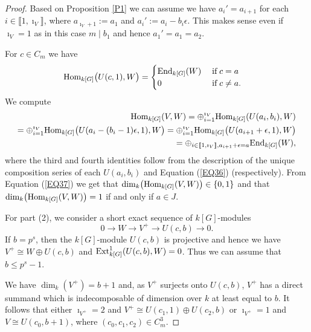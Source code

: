 \documentclass[11pt]{amsart}
\def\End{\textup{End}}
\def\Ext{\textup{Ext}}
\def\Hom{\textup{Hom}}
\begin{document}
\begin{proof}
Based on Proposition \ref{P1} we can assume we have $a_i'=a_{i+1}$ for each $i\in\llbracket1,\imath_V\rrbracket$, where $a_{\imath_V+1}:=a_1$ and $a_i':=a_i-b_i\epsilon$. This makes sense even if $\imath_V=1$ as in this case $m\mid b_1$ and hence $a_1'=a_1=a_2$. 

For $c\in C_m$ we have 
\begin{equation}\label{EQ36}
\Hom_{k[G]}\bigl(U(c,1),W\bigr)=\begin{cases}\End_{k[G]}(W)\quad\;\textup{if}\;c=a\\
0\quad\quad\quad\quad\quad\quad\textup{if}\;c\neq a.\end{cases}
\end{equation} 
We compute
\begin{equation}\label{EQ37}
\begin{split}
\Hom_{k[G]}(V,W)=\oplus_{i=1}^{\imath_V}\Hom_{k[G]}(U(a_i,b_i),W)\\
=\oplus_{i=1}^{\imath_V}\Hom_{k[G]}\bigl(U(a_i-(b_i-1)\epsilon,1),W\bigr)=\oplus_{i=1}^{\imath_V}\Hom_{k[G]}\bigl(U(a_{i+1}+\epsilon,1),W\bigr)\\
=\oplus_{i\in\llbracket1,\imath_V\rrbracket,a_{i+1}+\epsilon=a} \End_{k[G]}(W),\\
\end{split}
\end{equation}
where the third and fourth identities follow from the description of the unique composition series of each $U(a_i,b_i)$ and Equation (\ref{EQ36}) (respectively). 
From Equation (\ref{EQ37}) we get that $\dim_k\bigl(\Hom_{k[G]}(V,W)\bigr)\in\{0,1\}$ and that $\dim_k\bigl(\Hom_{k[G]}(V,W)\bigr)=1$ if and only if $a\in J$.

For part (2), we consider a short exact sequence of $k[G]$-modules 
\begin{equation}\label{EQ38}
0\rightarrow W\rightarrow V^+\rightarrow U(c,b)\rightarrow 0.
\end{equation} 
If $b=p^s$, then the $k[G]$-module $U(c,b)$ is projective and hence we have $V^+\cong W\oplus U(c,b)$ and $\Ext^1_{k[G]}(U(c,b),W)=0$. Thus we can assume that $b\le p^s-1$.

We have $\dim_k(V^+)=b+1$ and, as $V^+$ surjects onto $U(c,b)$, $V^+$ has a direct summand which is indecomposable of dimension over $k$ at least equal to $b$. It follows that either $\imath_{V^+}=2$ and $V^+\cong U(c_1,1)\oplus U(c_2,b)$ or $\imath_{V^+}=1$ and $V\cong U(c_0,b+1)$, where $(c_0,c_1,c_2)\in C_m^3$. 


\end{proof}
\end{document}
